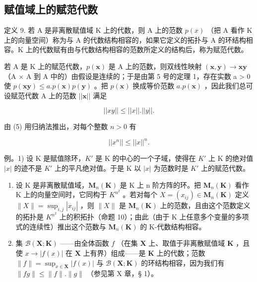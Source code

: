 \subsection{赋值域上的赋范代数}

定义 9. 若 A 是非离散赋值域 K 上的代数，则 A 上的范数 \(p(x)\) （把 A 看作 K 上的向量空间）称为与 A 的代数结构相容的，如果它定义的拓扑与 A 的环结构相容。K 上的代数赋有由与代数结构相容的范数所定义的结构后，称为赋范代数。

若 A 是 K 上的赋范代数，\(p(\boldsymbol{x})\) 是 A 上的范数，则双线性映射 \((\boldsymbol{x}, \boldsymbol{y}) \to \boldsymbol{x}\boldsymbol{y}\) （A × A 到 A 中的）由假设是连续的；于是由第 5 号的定理 1，存在实数 a \textgreater{} 0 使 \(p(\boldsymbol{x}\boldsymbol{y}) \leqslant a.p(\boldsymbol{x})p(\boldsymbol{y})\) 。把 \(p(\boldsymbol{x})\) 换成等价范数 \(a.p(\boldsymbol{x})\) ，因此我们总可设赋范代数 A 上的范数 \(||\boldsymbol{x}||\) 满足

\[
\left| \left| x y \right| \right| \leqslant \left| \left| x \right| \right|. \left| \left| y \right| \right|.\tag{5}
\]

由 (5) 用归纳法推出，对每个整数 \(n > 0\) 有

\[
\left| \left| x ^ {n} \right| \right| \leqslant \left| \left| x \right| \right| ^ {n}.\tag{6}
\]

例。1) 设 K 是赋值除环，\(K'\) 是 K 的中心的一个子域，使得在 \(K'\) 上 K 的绝对值 \(|x|\) 的迹不是 \(K'\) 上的平凡绝对值。于是 K 以 \(|x|\) 为范数时是 \(K'\) 上的赋范代数。

\begin{enumerate}
\def\labelenumi{\arabic{enumi})}
\setcounter{enumi}{1}
\item
  设 K 是非离散赋值域，\(\mathbf{M}_{n}(\mathbf{K})\) 是 K 上 n 阶方阵的环。把 \(\mathbf{M}_{n}(\mathbf{K})\) 看作 K 上的向量空间时，它同构于 \(K^{n^{2}}\) 。若对每个 \(X = (x_{ij}) \in \mathbf{M}_{n}(\mathbf{K})\) 定义 \(\|X\| = \sup_{i,j} |x_{ij}|\) ，则 \(\|X\|\) 是 \(\mathbf{M}_{n}(\mathbf{K})\) 上的范数，且由这个范数定义的拓扑是 \(K^{n^{2}}\) 上的积拓扑（命题 10）；由此（由于 K 上任意多个变量的多项式的连续性）推出这个范数与 \(\mathbf{M}_{n}(\mathbf{K})\) 的 K-代数结构相容。
\item
  集 \(\mathcal{B}(\mathbf{X};\mathbf{K})\) ——由全体函数 \(f\) （在集 \(\mathbf{X}\) 上、取值于非离散赋值域 \(\mathbf{K}\) ，且使 \(x\to |f(x)|\) 在 \(\mathbf{X}\) 上有界）组成——是 \(\mathbf{K}\) 上的代数；范数 \(\| f\| = \sup_{x\in \mathbf{X}}|f(x)|\) 与 \(\mathcal{B}(\mathbf{X};\mathbf{K})\) 的环结构相容，因为我们有 \(\| fg\| \leqslant \| f\| .\| g\|\) （参见第 X 章，§ 1）。
\end{enumerate}

